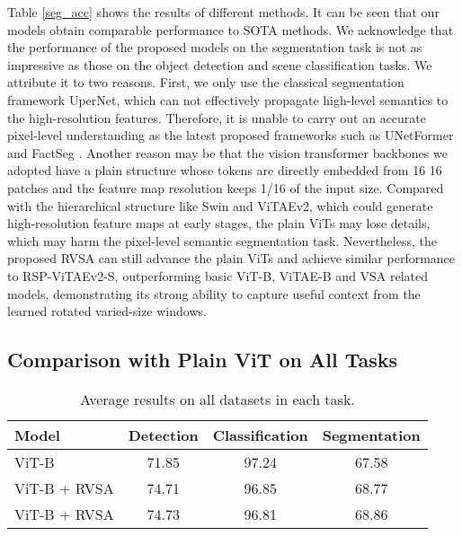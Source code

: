 \documentclass[10pt, journal,twoside]{IEEEtran}
\begin{document}
Table \ref{seg_acc} shows the results of different methods. It can be seen that our models obtain comparable performance to SOTA methods. We acknowledge that the performance of the proposed models on the segmentation task is not as impressive as those on the object detection and scene classification tasks. We attribute it to two reasons. First, we only use the classical segmentation framework UperNet, which can not effectively propagate high-level semantics to the high-resolution features. Therefore, it is unable to carry out an accurate pixel-level understanding as the latest proposed frameworks such as UNetFormer \cite{ass_2022_isprs_unetformer} and FactSeg \cite{ass_2022_tgrs_factseg}. Another reason may be that the vision transformer backbones we adopted have a plain structure whose tokens are directly embedded from 16  16 patches and the feature map resolution keeps 1/16 of the input size.
Compared with the hierarchical structure like Swin and ViTAEv2, which could generate high-resolution feature maps at early stages, the plain ViTs may lose details, which may harm the pixel-level semantic segmentation task. Nevertheless, the proposed RVSA can still advance the plain ViTs and achieve similar performance to RSP-ViTAEv2-S, outperforming basic ViT-B, ViTAE-B and VSA related models, demonstrating its strong ability to capture useful context from the learned rotated varied-size windows.

\subsection{Comparison with Plain ViT on All Tasks}

\begin{table}[t]
  \scriptsize
  \caption{Average results on all datasets in each task.}
  \newcommand{\tabincell}[2]{\begin{tabular}{@{}#1@{}}#2\end{tabular}}
  \centering
\begin{tabular}{l|ccc}
  \hline
  Model  & Detection & Classification & Segmentation  \\
  \hline
  ViT-B & 71.85  & 97.24 &  67.58 \\
  ViT-B + RVSA  & 74.71 & 96.85 & 68.77 \\
  ViT-B + RVSA  & 74.73 & 96.81  & 68.86 \\ 
  \hline
\end{tabular}
\label{all_task_datasets}
\end{table}
\end{document}
